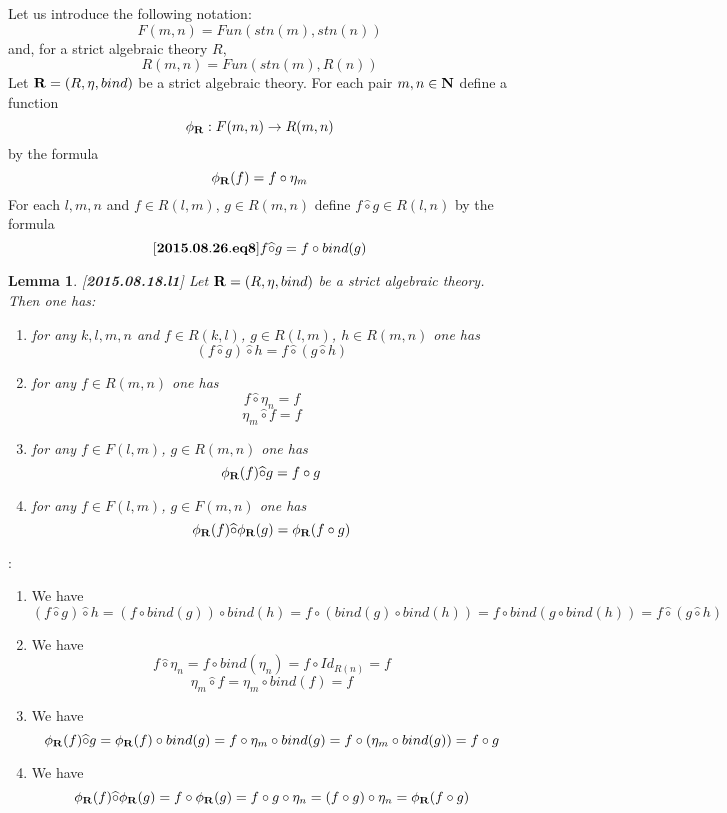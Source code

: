 \documentclass[11pt]{article}
\newenvironment{eq}{\begin{equation}}{\end{equation}}
\newenvironment{proof}{{\bf Proof}:}{\vskip 5mm }
\newtheorem{lemma}[proposition]{Lemma}
\newcommand{\llabel}[1]{\label{#1}[{\bf #1}]}
\newcommand{\sr}{\rightarrow}
\newcommand{\nn}{{\bf N\rm}}
\newcommand{\wh}{\widehat}
\newcommand{\bind}{bind}
\newcommand{\hc}{\wh{\circ}}
\begin{document}
Let us introduce the following notation:
%
$$F(m,n)=Fun(stn(m),stn(n))$$
%
and, for a strict algebraic theory $R$,
%
$$R(m,n)=Fun(stn(m),R(n))$$
%
Let ${\bf R}=(R,\eta,bind)$ be a strict algebraic theory. For each pair $m,n\in\nn$ define a function
%
$$\phi_{\bf R}:F(m,n)\sr R(m,n)$$
%
by the formula
%
$$\phi_{\bf R}(f)=f\circ \eta_m$$
%
For each $l,m,n$ and $f\in R(l,m)$, $g\in R(m,n)$ define $f\hc g\in R(l,n)$ by the formula
%
\begin{eq}\llabel{2015.08.26.eq8}
f\hc g = f\circ \bind(g)
\end{eq}
%
\begin{lemma}
\llabel{2015.08.18.l1}
Let ${\bf R}=(R,\eta,\bind)$ be a strict algebraic theory. Then one has:
%
\begin{enumerate}
\item for any $k,l,m,n$ and $f\in R(k,l)$, $g\in R(l,m)$, $h\in R(m,n)$ one has
%
$$(f\hc g)\hc h=f\hc(g\hc h)$$
%
\item for any $f\in R(m,n)$ one has
%
$$f\hc \eta_n=f$$
$$\eta_m\hc f=f$$
%
\item for any $f\in F(l,m)$, $g\in R(m,n)$ one has
%
$$\phi_{\bf R}(f)\hc g=f\circ g$$
%
\item for any $f\in F(l,m)$, $g\in F(m,n)$ one has
%
$$\phi_{\bf R}(f)\hc \phi_{\bf R}(g)=\phi_{\bf R}(f\circ g)$$
%
\end{enumerate}
\end{lemma}
%
\begin{proof}
\begin{enumerate}
\item We have
%
$$(f\hc g)\hc h=(f\circ \bind(g))\circ \bind(h)=f\circ (\bind(g)\circ \bind(h))=f\circ \bind(g\circ \bind(h))=f\hc (g\hc h)$$
%
\item We have
%
$$f\hc \eta_n=f\circ \bind(\eta_n)=f\circ Id_{R(n)}=f$$
$$\eta_m\hc f=\eta_m\circ \bind(f)=f$$
%
\item We have 
%
$$\phi_{\bf R}(f)\hc g=\phi_{\bf R}(f)\circ \bind(g)=f\circ \eta_m\circ \bind(g)=f\circ (\eta_m\circ \bind(g))=f\circ g$$
%
\item We have
%
$$\phi_{\bf R}(f)\hc \phi_{\bf R}(g)=f\circ \phi_{\bf R}(g)=f\circ g\circ \eta_n=(f\circ g)\circ \eta_n=\phi_{\bf R}(f\circ g)$$
%
\end{enumerate}
\end{proof}
%
\end{document}
